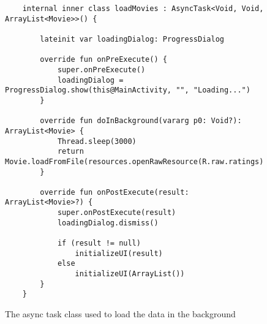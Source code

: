 \documentclass{scrartcl}
\begin{document}
\begin{figure}[h]
    \begin{verbatim}
    internal inner class loadMovies : AsyncTask<Void, Void, ArrayList<Movie>>() {

        lateinit var loadingDialog: ProgressDialog

        override fun onPreExecute() {
            super.onPreExecute()
            loadingDialog = ProgressDialog.show(this@MainActivity, "", "Loading...")
        }

        override fun doInBackground(vararg p0: Void?): ArrayList<Movie> {
            Thread.sleep(3000)
            return Movie.loadFromFile(resources.openRawResource(R.raw.ratings))
        }

        override fun onPostExecute(result: ArrayList<Movie>?) {
            super.onPostExecute(result)
            loadingDialog.dismiss()

            if (result != null)
                initializeUI(result)
            else
                initializeUI(ArrayList())
        }
    }
    \end{verbatim}
    \caption{The async task class used to load the data in the background}
\end{figure}
\end{document}

